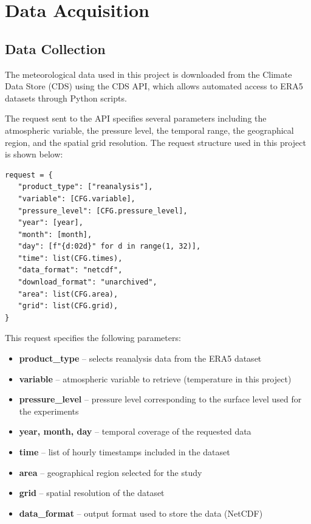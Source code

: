 \section{Data Acquisition}
\subsection{Data Collection}

The meteorological data used in this project is downloaded from the Climate Data Store (CDS) using the CDS API, which allows automated access to ERA5 datasets through Python scripts.

The request sent to the API specifies several parameters including the atmospheric variable, the pressure level, the temporal range, the geographical region, and the spatial grid resolution. The request structure used in this project is shown below:

\begin{verbatim}
request = {
   "product_type": ["reanalysis"],
   "variable": [CFG.variable],
   "pressure_level": [CFG.pressure_level],
   "year": [year],
   "month": [month],
   "day": [f"{d:02d}" for d in range(1, 32)],
   "time": list(CFG.times),
   "data_format": "netcdf",
   "download_format": "unarchived",
   "area": list(CFG.area),
   "grid": list(CFG.grid),
}
\end{verbatim}

This request specifies the following parameters:

\begin{itemize}
    \item \textbf{product\_type} -- selects reanalysis data from the ERA5 dataset
    \item \textbf{variable} -- atmospheric variable to retrieve (temperature in this project)
    \item \textbf{pressure\_level} -- pressure level corresponding to the surface level used for the experiments
    \item \textbf{year, month, day} -- temporal coverage of the requested data
    \item \textbf{time} -- list of hourly timestamps included in the dataset
    \item \textbf{area} -- geographical region selected for the study
    \item \textbf{grid} -- spatial resolution of the dataset
    \item \textbf{data\_format} -- output format used to store the data (NetCDF)
\end{itemize}

